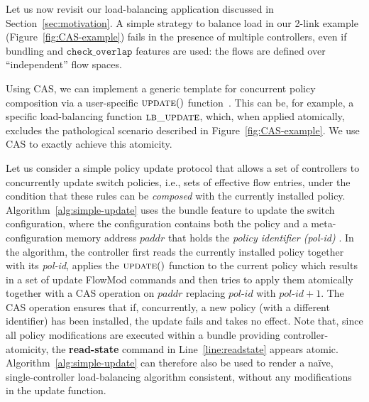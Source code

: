 \documentclass{sig-alternate-2006}
\newcommand{\paddr}{\textit{paddr}\xspace}
\newcommand{\pid}{\textit{pol-id}\xspace}
\newcommand{\checko}{\texttt{check\_overlap}\xspace}
\newcommand{\ufunc}{update} %
\newcommand{\petr}[1]{\textit{\textcolor{blue}{[petr]: #1}}} %
\newcommand{\execatomic}{\textbf{execute-transaction}}
\begin{document}
Let us now revisit our load-balancing application
discussed in Section~\ref{sec:motivation}.
A simple strategy to balance load in our 2-link example
 (Figure~\ref{fig:CAS-example}) fails in the presence of
multiple controllers, even if 
bundling and $\checko$ features are used:
the flows are defined over ``independent'' 
flow spaces. 

Using CAS, we can implement a
generic template 
for concurrent policy composition via a user-specific
$\textsc{\ufunc}()$ function~\cite{stn}.
This can be, for example, a specific load-balancing
function $\textsc{lb\_update}$, %
which, when applied atomically, excludes the pathological scenario described in 
Figure~\ref{fig:CAS-example}. 
We use CAS to exactly achieve this atomicity.

Let us consider a simple policy update protocol that
allows a set of  controllers to concurrently update switch policies, i.e., sets of
effective flow entries, under the
condition that these rules can be \emph{composed} with the currently installed
policy.
Algorithm~\ref{alg:simple-update} uses the bundle feature to update
the switch configuration, where the configuration contains both the
policy and a meta-configuration memory address $\paddr$ that holds the \emph{policy identifier (\pid)} .
In the algorithm, the controller first reads the currently installed
policy together with its {\pid},  applies the
$\textsc{\ufunc}()$ function to the current policy which results in a
set of update FlowMod commands and then tries to apply them
atomically together with a CAS operation on $\paddr$ replacing $\pid$
with $\pid+1$.
The CAS operation ensures that if, concurrently, a new policy (with a different identifier) has been installed, the update
fails and takes no effect.
Note that, since all policy modifications are executed within a
bundle providing controller-atomicity, the \textbf{read-state} command
in Line~\ref{line:readstate} appears atomic.  
Algorithm~\ref{alg:simple-update} can therefore also be used
to render a na\"ive, single-controller load-balancing algorithm
consistent, without any modifications in the update function.
\end{document}
